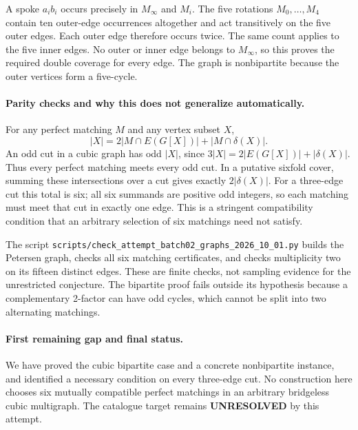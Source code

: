 \documentclass[11pt,a4paper]{article}
\begin{document}
A spoke $a_i b_i$ occurs precisely in $M_\infty$ and $M_i$. The five rotations $M_0,\ldots,M_4$ contain ten outer-edge occurrences altogether and act transitively on the five outer edges. Each outer edge therefore occurs twice. The same count applies to the five inner edges. No outer or inner edge belongs to $M_\infty$, so this proves the required double coverage for every edge. The graph is nonbipartite because the outer vertices form a five-cycle.

\paragraph{Parity checks and why this does not generalize automatically.}
For any perfect matching $M$ and any vertex subset $X$,
\[
 |X|=2|M\cap E(G[X])|+|M\cap\delta(X)|. \tag{1}
\]
An odd cut in a cubic graph has odd $|X|$, since $3|X|=2|E(G[X])|+|\delta(X)|$. Thus every perfect matching meets every odd cut. In a putative sixfold cover, summing these intersections over a cut gives exactly $2|\delta(X)|$. For a three-edge cut this total is six; all six summands are positive odd integers, so each matching must meet that cut in exactly one edge. This is a stringent compatibility condition that an arbitrary selection of six matchings need not satisfy.

The script \texttt{scripts/check\_attempt\_batch02\_graphs\_2026\_10\_01.py} builds the Petersen graph, checks all six matching certificates, and checks multiplicity two on its fifteen distinct edges. These are finite checks, not sampling evidence for the unrestricted conjecture. The bipartite proof fails outside its hypothesis because a complementary 2-factor can have odd cycles, which cannot be split into two alternating matchings.

\paragraph{First remaining gap and final status.}
We have proved the cubic bipartite case and a concrete nonbipartite instance, and identified a necessary condition on every three-edge cut. No construction here chooses six mutually compatible perfect matchings in an arbitrary bridgeless cubic multigraph. The catalogue target remains \textbf{UNRESOLVED} by this attempt.
\end{document}
